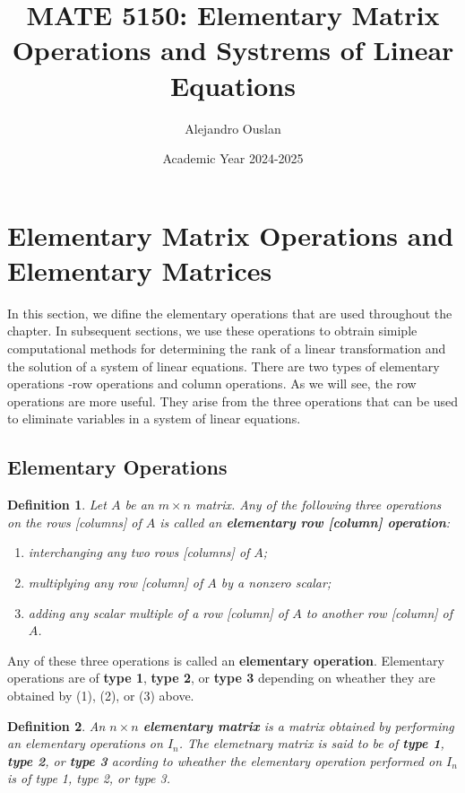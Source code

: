 \documentclass[10pt, oneside]{article}
\title{MATE 5150: Elementary Matrix Operations and Systrems of Linear Equations}
\author{Alejandro Ouslan}
\date{Academic Year 2024-2025}
\newtheorem{defn}{Definition}
\begin{document}
\maketitle
\tableofcontents

\vspace{.25in}

\section{Elementary Matrix Operations and Elementary Matrices}

In this section, we difine the elementary operations that are used throughout the chapter. In subsequent sections, we use these
operations to obtrain simiple computational methods for determining the rank of a linear transformation and the solution of a
system of linear equations. There are two types of elementary operations -row operations and column operations. As we will see,
the row operations are more useful. They arise from the three operations that can be used to eliminate variables in a system of linear equations.

\subsection{Elementary Operations}
\begin{defn}
	Let $A$ be an $m \times n$ matrix. Any of the following three operations on the rows [columns] of $A$ is called an \textbf{elementary row [column] operation}:
	\begin{enumerate}
		\item interchanging any two rows [columns] of $A$;
		\item multiplying any row [column] of $A$ by a nonzero scalar;
		\item adding any scalar multiple of a row [column] of $A$ to another row [column] of $A$.
	\end{enumerate}
\end{defn}

Any of these three operations is called an \textbf{elementary operation}. Elementary operations are of \textbf{type 1}, \textbf{type 2}, or \textbf{type 3} depending on
wheather they are obtained by (1), (2), or (3) above.

\begin{defn}
	An $n \times n$ \textbf{elementary matrix} is a matrix obtained by performing an elementary operations on $I_n$. The elemetnary matrix is said to be of \textbf{type 1}, \textbf{type 2}, or \textbf{type 3}
	acording to wheather the elementary operation performed on $I_n$ is of type 1, type 2, or type 3.
\end{defn}
\end{document}
